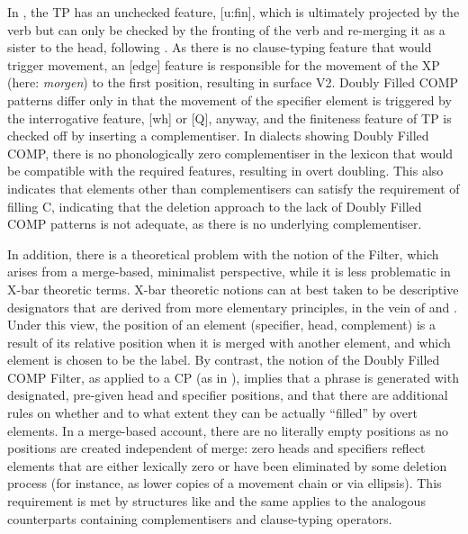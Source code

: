In , the TP has an unchecked feature, [u:fin], which is ultimately projected by the verb but can only be checked by the fronting of the verb and re-merging it as a sister to the head, following \citet[309]{fanselow2004}. As there is no clause-typing feature that would trigger movement, an [edge] feature is responsible for the movement of the XP (here: \textit{morgen}) to the first position, resulting in surface V2. Doubly Filled COMP patterns differ only in that the movement of the specifier element is triggered by the interrogative feature, [wh] or [Q], anyway, and the finiteness feature of TP is checked off by inserting a complementiser. In dialects showing Doubly Filled COMP, there is no phonologically zero complementiser in the lexicon that would be compatible with the required features, resulting in overt doubling. This also indicates that elements other than complementisers can satisfy the requirement of filling C, indicating that the deletion approach to the lack of Doubly Filled COMP patterns is not adequate, as there is no underlying complementiser.

In addition, there is a theoretical problem with the notion of the Filter, which arises from a merge-based, minimalist perspective, while it is less problematic in X-bar theoretic terms. X-bar theoretic notions can at best taken to be descriptive designators that are derived from more elementary principles, in the vein of \citet{kayne1994} and \citet{chomsky1995}. Under this view, the position of an element (specifier, head, complement) is a result of its relative position when it is merged with another element, and which element is chosen to be the label. By contrast, the notion of the Doubly Filled COMP Filter, as applied to a CP (as in \citealt{baltin2010}), implies that a phrase is generated with designated, pre-given head and specifier positions, and that there are additional rules on whether and to what extent they can be actually ``filled'' by overt elements. In a merge-based account, there are no literally empty positions as no positions are created independent of merge: zero heads and specifiers reflect elements that are either lexically zero or have been eliminated by some deletion process (for instance, as lower copies of a movement chain or via ellipsis). This requirement is met by structures like  and the same applies to the analogous counterparts containing complementisers and clause-typing operators.

